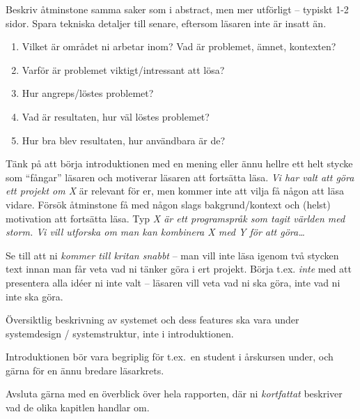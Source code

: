 Beskriv åtminstone samma saker som i abstract, men mer utförligt -- typiskt 1-2 sidor. Spara tekniska detaljer till senare, eftersom läsaren inte är insatt än.

\begin{enumerate}
\item Vilket är området ni arbetar inom? Vad är problemet, ämnet, kontexten? 
\item Varför är problemet viktigt/intressant att lösa?
\item Hur angreps/löstes problemet? 
\item Vad är resultaten, hur väl löstes problemet?
\item Hur bra blev resultaten, hur användbara är de?
\end{enumerate}

Tänk på att börja introduktionen med en mening eller ännu hellre ett helt stycke som ``fångar'' läsaren och motiverar läsaren att fortsätta läsa.  \emph{Vi har valt att göra ett projekt om X} är relevant för er, men kommer inte att vilja få någon att läsa vidare.  Försök åtminstone få med någon slags bakgrund/kontext och (helst) motivation att fortsätta läsa.  Typ \emph{X är ett programspråk som tagit världen med storm.  Vi vill utforska om man kan kombinera X med Y för att göra\ldots}

Se till att ni \emph{kommer till kritan snabbt} – man vill inte läsa igenom två stycken text innan man får veta vad ni tänker göra i ert projekt.  Börja t.ex. \emph{inte} med att presentera alla idéer ni inte valt – läsaren vill veta vad ni ska göra, inte vad ni inte ska göra.

Översiktlig beskrivning av systemet och dess features ska vara under systemdesign / systemstruktur, inte i introduktionen.

Introduktionen bör vara begriplig för t.ex.~en student i årskursen under, och gärna för en ännu bredare läsarkrets.

Avsluta gärna med en överblick över hela rapporten, där ni \emph{kortfattat} beskriver vad de olika kapitlen handlar om.

